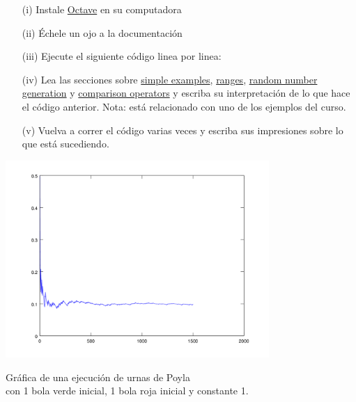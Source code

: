 \begin{problema}
	\begin{enumerate}
		\item[(i)] 
			Instale \href{www.octave.org}{Octave} en su computadora
		\item[(ii)] 
			\'Echele un ojo a la documentaci\'on
		\item[(iii)] 
			Ejecute el siguiente c\'odigo linea por linea: 
		\item[(iv)] 
			Lea las secciones sobre 
			\href{http://www.gnu.org/software/octave/doc/interpreter/Simple-Examples.html#Simple-Examples}{simple examples}, 
			\href{http://www.gnu.org/software/octave/doc/interpreter/Ranges.html#Ranges}{ranges}, 
			\href{http://www.gnu.org/software/octave/doc/interpreter/Random-Number-Generation.html#Random-Number-Generation}{random number generation} 
			y 
			\href{http://www.gnu.org/software/octave/doc/interpreter/Comparison-Ops.html#Comparison-Ops}{comparison operators} 
			y escriba su interpretaci\'on de lo que hace el c\'odigo anterior. Nota: est\'a relacionado con uno de los ejemplos del curso.
		\item[(v)] 
			Vuelva a correr el c\'odigo varias veces y escriba sus impresiones sobre lo que est\'a sucediendo.
	\end{enumerate}
\end{problema}

\begin{center}
	\includegraphics[width=10cm]{tarea2/problema2_2/poyla.PNG}
\end{center}
\begin{center}
	Gráfica de una ejecución de urnas de Poyla \\
	con 1 bola verde inicial, 1 bola roja inicial y constante 1.
\end{center}